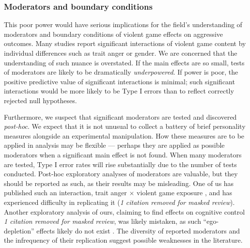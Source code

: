 \documentclass[man, mask]{apa6}
\begin{document}
\subsubsection{Moderators and boundary conditions}
This poor power would have serious implications for the field's understanding of moderators and boundary conditions of violent game effects on aggressive outcomes. Many studies report significant interactions of violent game content by individual differences such as trait anger or gender. We are concerned that the understanding of such nuance is overstated. If the main effects are so small, tests of moderators are likely to be dramatically {\em underpowered}. If power is poor, the positive predictive value of significant interactions is minimal; such significant interactions would be more likely to be Type I errors than to reflect correctly rejected null hypotheses. 

Furthermore, we suspect that significant moderators are tested and discovered {\em post-hoc}. We expect that it is not unusual to collect a battery of brief personality measures alongside an experimental manipulation. How these measures are to be applied in analysis may be flexible --- perhaps they are applied as possible moderators when a significant main effect is not found. When many moderators are tested, Type I error rates will rise substantially due to the number of tests conducted. Post-hoc exploratory analyses of moderators are valuable, but they should be reported as such, as their results may be misleading. %
One of us has published such an interaction, trait anger $\times$ violent game exposure , and has experienced difficulty in replicating it ({\em 1 citation removed for masked review}). Another exploratory analysis of ours, claiming to find effects on cognitive control {\em 1 citation removed for masked review}, was likely mistaken, as such ``ego-depletion'' effects likely do not exist \citep{Hagger:etal:inpress}. The diversity of reported moderators and the infrequency of their replication suggest possible weaknesses in the literature. 
\end{document}
